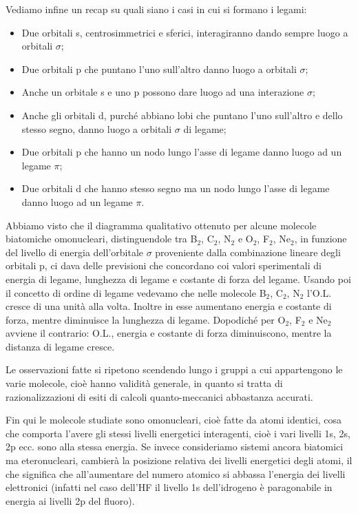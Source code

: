 \vspace{0.2cm}Vediamo infine un recap su quali siano i casi in cui si formano i legami:
\begin{itemize}
    \item Due orbitali s, centrosimmetrici e sferici, interagiranno dando sempre luogo a orbitali $\sigma$; 
    \item Due orbitali p che puntano l'uno sull'altro danno luogo a orbitali $\sigma$;
    \item Anche un orbitale s e uno p possono dare luogo ad una interazione $\sigma$;
    \item Anche gli orbitali d, purché abbiano lobi che puntano l'uno sull'altro e dello stesso segno, danno luogo a orbitali $\sigma$ di legame;
    \item Due orbitali p che hanno un nodo lungo l'asse di legame danno luogo ad un legame $\pi$;
    \item Due orbitali d che hanno stesso segno ma un nodo lungo l'asse di legame danno luogo ad un legame $\pi$.
\end{itemize}

Abbiamo visto che il diagramma qualitativo ottenuto per alcune molecole biatomiche omonucleari, distinguendole tra B$_2$, C$_2$, N$_2$ e O$_2$, F$_2$, Ne$_2$, in funzione del livello di energia dell'orbitale $\sigma$ proveniente dalla combinazione lineare degli orbitali p, ci dava delle previsioni che concordano coi valori sperimentali di energia di legame, lunghezza di legame e costante di forza del legame. Usando poi il concetto di ordine di legame vedevamo che nelle molecole B$_2$, C$_2$, N$_2$  l'O.L. cresce di una unità alla volta. Inoltre in esse aumentano energia e costante di forza, mentre diminuisce la lunghezza di legame. Dopodiché per O$_2$, F$_2$ e Ne$_2$ avviene il contrario: O.L., energia e costante di forza diminuiscono, mentre la distanza di legame cresce.

Le osservazioni fatte si ripetono scendendo lungo i gruppi a cui appartengono le varie molecole, cioè hanno validità generale, in quanto si tratta di razionalizzazioni di esiti di calcoli quanto-meccanici abbastanza accurati.

Fin qui le molecole studiate sono omonucleari, cioè fatte da atomi identici, cosa che comporta l'avere gli stessi livelli energetici interagenti, cioè i vari livelli 1s, 2s, 2p ecc. sono alla stessa energia. Se invece consideriamo sistemi ancora biatomici ma eteronucleari, cambierà la posizione relativa dei livelli energetici degli atomi, il che significa che all'aumentare del numero atomico si abbassa l'energia dei livelli elettronici (infatti nel caso dell'HF il livello 1s dell'idrogeno è paragonabile in energia ai livelli 2p del fluoro).

